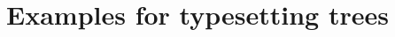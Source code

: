 \documentclass[a4paper]{scrartcl}
\begin{document}
    \section*{Examples for typesetting trees}
\end{document}
